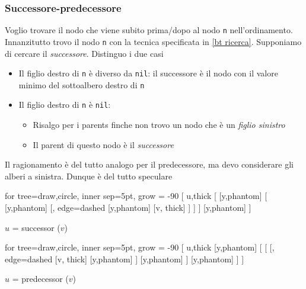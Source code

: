 \subsubsection{Successore-predecessore}
Voglio trovare il nodo che viene subito prima/dopo al nodo \verb|n| nell'ordinamento. Innanzitutto trovo il nodo \verb|n| con la tecnica specificata in \ref{bt ricerca}. Supponiamo di cercare il \textit{successore}. Distinguo i due casi
\begin{itemize}
	\item Il figlio destro di \verb|n| è diverso da \verb|nil|: il successore è il nodo con il valore minimo del sottoalbero destro di \verb|n|
	\item Il figlio destro di \verb|n| è \verb|nil|:
	      \begin{itemize}
		      \item Risalgo per i parents finche non trovo un nodo che è un \textit{figlio sinistro}
		      \item Il parent di questo nodo è il \textit{successore}
	      \end{itemize}
\end{itemize}
Il ragionamento è del tutto analogo per il predecessore, ma devo considerare gli alberi a sinistra. Dunque è del tutto speculare
\vskip3mm
\begin{minipage}[t]{0.48\textwidth}
	\begin{center}
		\begin{forest}
			for tree={draw,circle, inner sep=5pt, grow = -90}
			[ u,thick
			[
			[y,phantom]
				[
					[y,phantom]
						[, edge={dashed}
								[y,phantom]
								[v, thick]
						]
				]
			]
			[y,phantom]
			]
		\end{forest}
		\vskip3mm
		$ u $ = successor ($ v $)
	\end{center}
\end{minipage}
%
\begin{minipage}[t]{0.48\textwidth}
	\begin{center}
		\begin{forest}
			for tree={draw,circle, inner sep=5pt, grow = -90}
			[ u,thick
			[y,phantom]
			[
			[
					[, edge={dashed}
								[v, thick]
								[y,phantom]
						]
						[y,phantom]
				]
				[y,phantom]
			]
			]
		\end{forest}
		\vskip3mm
		$ u $ = predecessor ($ v $)
	\end{center}
\end{minipage}

